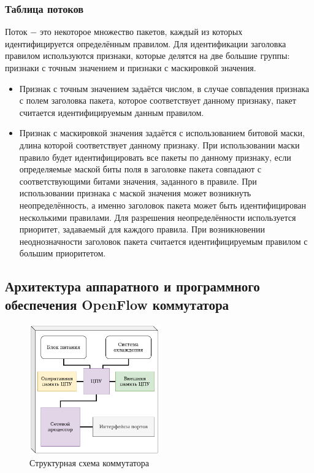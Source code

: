 \documentclass[oneside,final,12pt]{extarticle}
\begin{document}
            \subsubsection{Таблица потоков}
                Поток $-$ это некоторое множество пакетов, каждый из которых идентифицируется определённым правилом. Для идентификации заголовка правилом
                используются признаки, которые делятся на две большие группы: признаки с точным значением и признаки с маскировкой значения.
                \begin{itemize}
                    \item Признак с точным значением задаётся числом, в случае совпадения признака с полем заголовка пакета, которое соответствует данному признаку,
                        пакет считается идентифицируемым данным правилом.
                    \item Признак с маскировкой значения задаётся с использованием битовой маски, длина которой соответствует данному признаку. При использовании
                        маски правило будет идентифицировать все пакеты по данному признаку, если определяемые маской биты поля в заголовке пакета совпадают с соответствующими битами
                        значения, заданного в правиле. При использовании признака с маской значения может возникнуть неопределённость, а именно заголовок пакета может
                        быть идентифицирован несколькими правилами. Для разрешения неопределённости используется приоритет, задаваемый для каждого правила. При возникновении
                        неоднозначности заголовок пакета считается идентифицируемым правилом с большим приоритетом.
                \end{itemize}
        \subsection{Архитектура аппаратного и программного обеспечения OpenFlow коммутатора}

        \begin{figure}[htb!]
            \centering
            \includegraphics[width=0.5\textwidth]{switch}
            \caption{Структурная схема коммутатора}
            \label{image_switch}
        \end{figure}
\end{document}
